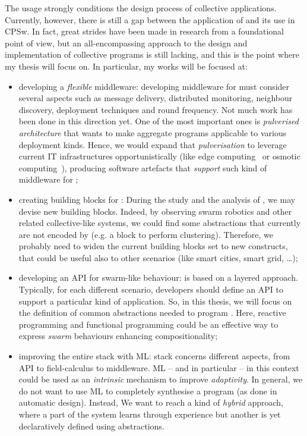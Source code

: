 \documentclass[11pt]{article}
\begin{document}
The \ac{} usage strongly conditions the design process of collective applications.
%
Currently, however, there is still a gap between the application of \ac{} and its use in CPSw. 
%
In fact, great strides have been made in research from a foundational point of view, but an all-encompassing approach to the design and implementation of collective programs is still lacking, and this is the point where my thesis will focus on.
%
In particular, my works will be focused at:
\begin{itemize}
	\item developing a \textit{flexible} middleware: 
	developing middleware for \ac{} must consider several aspects such as message delivery, distributed monitoring, neighbour discovery, deployment techniques and round frequency. Not much work has been done in this direction yet. One of the most important ones is \emph{pulverised architecture}\cite{DBLP:journals/fi/CasadeiPPVW20} that wants to make aggregate programs applicable to various deployment kinds. Hence, we would expand that \emph{pulverisation} to leverage current IT infrastructures opportunistically (like edge computing~\cite{DBLP:journals/computer/Satyanarayanan17} or osmotic computing~\cite{DBLP:journals/cloudcomp/VillariFDRR16}), producing software artefacts that \textit{support} such kind of middleware for \cpsw{};
	\item creating building blocks for \cpsw{}: During the study and the analysis of \cpsw{}, we may devise new building blocks. Indeed, by observing swarm robotics and other related collective-like systems, we could find some abstractions that currently are not encoded by \ac{} (e.g. a block to perform clustering). Therefore, we probably need to widen the current building blocks set to new constructs, that could be useful also to other scenarios (like smart cities, smart grid, \dots{});
	\item developing an API for swarm-like behaviour: \ac{} is based on a layered approach. Typically, for each different scenario, developers should define an API to support a particular kind of application. So, in this thesis, we will focus on the definition of common abstractions needed to program \cpsw{}. Here, reactive programming and functional programming could be an effective way to express \textit{swarm} behaviours enhancing compositionality;
	\item improving the entire \ac{} stack with ML: \ac{} stack concerns different aspects, from API to field-calculus to middleware. ML -- and in particular \rl{} -- in this context could be used as an \emph{intrinsic} mechanism to improve \emph{adaptivity}. In general, we do not want to use ML to completely synthesise a program (as done in automatic design). Instead, We want to reach a kind of \textit{hybrid} approach, where a part of the system learns through experience but another is yet declaratively defined using \ac{} abstractions.
\end{itemize}
\end{document}
